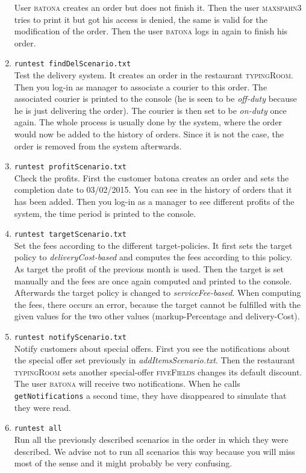 \begin{enumerate}[itemsep=0mm]
		User \textsc{batona} creates an order but 
		does not finish it. Then the user \textsc{maxspahn3} tries to print it but got his
		access is denied, the same is valid for the modification of the order. Then the 
		user \textsc{batona} logs in again to finish his order.
	\item \lstinline|runtest findDelScenario.txt| \\
		Test the delivery system. It creates
		an order in the restaurant \textsc{typingRoom}. Then you log-in as manager to 
		associate a courier to this order. The associated courier is printed to the console 
		(he is seen to be \textit{off-duty} because he is just delivering the order). 
		The courier is then set to be \textit{on-duty} once again. The whole process is 
		usually done by the system, where the order would now be added to the history of 
		orders. Since it is not the case, the order is removed from the system afterwards.
	\item \lstinline|runtest profitScenario.txt| \\ 
		Check the profits. First the customer batona creates an order and sets the completion
		date to \textsc{03/02/2015}. You can see in the history of orders that it has been added.
		Then you log-in as a manager to see different profits of the system,
		the time period is printed to the console.
	\item \lstinline|runtest targetScenario.txt| \\
		Set the fees according to the different target-policies. It first sets the target policy to
		\textit{deliveryCost-based} and computes the fees according to this policy. As 
		target the profit of the previous month is used. Then the target is set manually and
		the fees are once again computed and printed to the console. Afterwards the 
		target policy is changed to \textit{serviceFee-based}. When computing the fees, there
		occurs an error, because the target cannot be fulfilled with the given values for 
		the two other values (markup-Percentage and delivery-Cost).
	\item \lstinline|runtest notifyScenario.txt| \\
		Notify customers about special offers. First you see the notifications about the 
		special offer set previously in \textit{addItemsScenario.txt}. Then the restaurant
		\textsc{typingRoom} sets another special-offer \textsc{fiveFields} changes its
		default discount. The user \textsc{batona} will receive two notifications. When he 
		calls \lstinline|getNotifications| a second time, they have disappeared to 
		simulate that they were read.
	\item \lstinline|runtest all| \\
		Run all the previously described scenarios in the order in which they were 
		described. We advise not to run all scenarios this way because you will
		miss most of the sense and it might probably be very confusing.
\end{enumerate}

